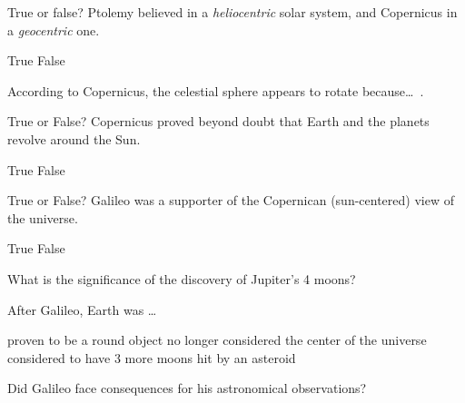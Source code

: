 \documentclass[addpoints]{exam}
\begin{document}
\begin{questions}
\question
True or false? Ptolemy believed in a \textit{heliocentric} solar system, and Copernicus in a \textit{geocentric} one.

\begin{choices}
    \choice True
    \correctchoice False
\end{choices}

\question
According to Copernicus, the celestial sphere appears to rotate because\ldots\ .


\question
True or False? Copernicus proved beyond doubt that Earth and the planets revolve around the Sun.

\begin{choices}
    \choice True
    \correctchoice False
\end{choices}

\question
True or False? Galileo was a supporter of the Copernican (sun-centered) view of the universe.

\begin{choices}
    \correctchoice True
    \choice False
\end{choices}

\question
What is the significance of the discovery of Jupiter's 4 moons?


\question
After Galileo, Earth was \ldots

\begin{choices}
    \choice proven to be a round object
    \correctchoice no longer considered the center of the universe
    \choice considered to have 3 more moons
    \choice hit by an asteroid
\end{choices}

\question
Did Galileo face consequences for his astronomical observations?


\end{questions}
\end{document}
